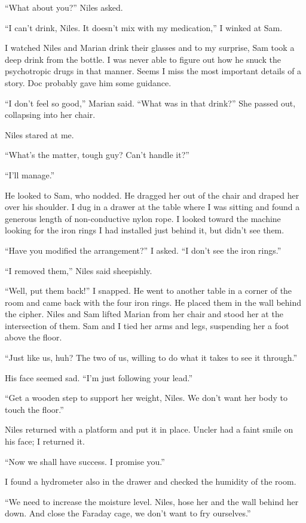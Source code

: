 \documentclass[
]{article}
\begin{document}
``What about you?'' Niles asked.

``I can't drink, Niles. It doesn't mix with my medication,'' I winked at
Sam.

I watched Niles and Marian drink their glasses and to my surprise, Sam
took a deep drink from the bottle. I was never able to figure out how he
snuck the psychotropic drugs in that manner. Seems I miss the most
important details of a story. Doc probably gave him some guidance.

``I don't feel so good,'' Marian said. ``What was in that drink?'' She
passed out, collapsing into her chair.

Niles stared at me.

``What's the matter, tough guy? Can't handle it?''

``I'll manage.''

He looked to Sam, who nodded. He dragged her out of the chair and draped
her over his shoulder. I dug in a drawer at the table where I was
sitting and found a generous length of non-conductive nylon rope. I
looked toward the machine looking for the iron rings I had installed
just behind it, but didn't see them.

``Have you modified the arrangement?'' I asked. ``I don't see the iron
rings.''

``I removed them,'' Niles said sheepishly.

``Well, put them back!'' I snapped. He went to another table in a corner
of the room and came back with the four iron rings. He placed them in
the wall behind the cipher. Niles and Sam lifted Marian from her chair
and stood her at the intersection of them. Sam and I tied her arms and
legs, suspending her a foot above the floor.

``Just like us, huh? The two of us, willing to do what it takes to see
it through.''

His face seemed sad. ``I'm just following your lead.''

``Get a wooden step to support her weight, Niles. We don't want her body
to touch the floor.''

Niles returned with a platform and put it in place. Uncler had a faint
smile on his face; I returned it.

``Now we shall have success. I promise you.''

I found a hydrometer also in the drawer and checked the humidity of the
room.

``We need to increase the moisture level. Niles, hose her and the wall
behind her down. And close the Faraday cage, we don't want to fry
ourselves.''
\end{document}
